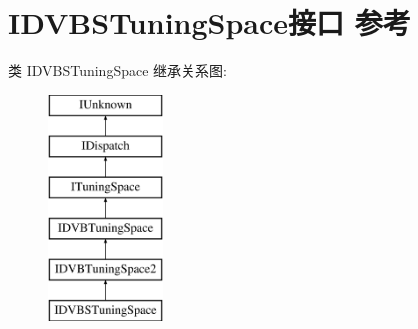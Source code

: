 \hypertarget{interface_i_d_v_b_s_tuning_space}{}\section{I\+D\+V\+B\+S\+Tuning\+Space接口 参考}
\label{interface_i_d_v_b_s_tuning_space}
类 I\+D\+V\+B\+S\+Tuning\+Space 继承关系图\+:\begin{figure}[H]
\begin{center}
\leavevmode
\includegraphics[height=6.000000cm]{interface_i_d_v_b_s_tuning_space}
\end{center}
\end{figure}
